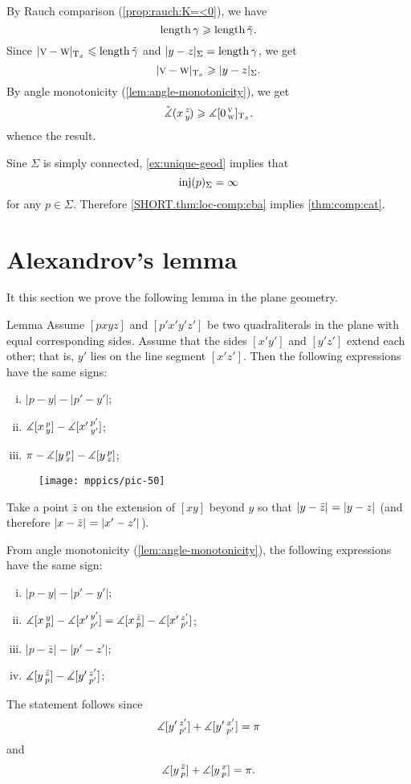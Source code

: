 By Rauch comparison (\ref{prop:rauch:K=<0}), we have
\[\mathop{\rm length}\nolimits\gamma\geqslant \mathop{\rm length}\nolimits \tilde \gamma.\]
Since $|\textsc v-\textsc w|_{\mathrm{T}_x}\leqslant\mathop{\rm length}\nolimits\tilde \gamma$ and $|y-z|_{\Sigma}= \mathop{\rm length}\nolimits\gamma$, we get 
\[|\textsc v-\textsc w|_{\mathrm{T}_x}\geqslant |y-z|_\Sigma.\]
By angle monotonicity (\ref{lem:angle-monotonicity}), we get
\[\tilde\measuredangle(x\,{}^{z}_{y}\hspace{-0.2ex})\geqslant\measuredangle[0\,{}^{\textsc v}_{\textsc w}]_{\mathrm{T}_x}.\]
whence the result.
\qeds

Sine $\Sigma$ is simply connected, \ref{ex:unique-geod} implies that 
\[\mathop{\rm inj}\nolimits(p)_\Sigma=\infty\]
for any $p\in\Sigma$.
Therefore \ref{SHORT.thm:loc-comp:cba} implies \ref{thm:comp:cat}.
\qeds


\section{Alexandrov's lemma}

It this section we prove the following lemma in the plane geometry.

\begin{thm}{Lemma}
\label{lem:alex}
Assume $[pxyz]$ and $[p'x'y'z']$ be two quadraliterals in the plane with equal corresponding sides.
Assume that the sides $[x'y']$ and $[y'z']$ extend each other; that is, $y'$ lies on the line segment $[x'z']$.
Then the following expressions have the same signs:
\begin{enumerate}[(i)]
 \item $|p-y|-|p'-y'|$;
 \item $\measuredangle[x\,{}^{p}_{y}]-\measuredangle[x'\,{}^{p'}_{y'}]$;
 \item $\pi-\measuredangle[y\,{}^{p}_{x}]-\measuredangle[y\,{}^{p}_{z}]$;
\end{enumerate}
\end{thm}

\begin{figure}[h!]
\vskip-0mm
\centering
\texttt{[image: mppics/pic-50]}
\vskip-0mm
\end{figure}

Take 
a point $\bar z$ on the extension of 
$[xy]$ beyond $y$ so that $\dist{y}{\bar z}{}=\dist{y}{z}{}$ (and therefore $\dist{x}{\bar z}{}=\dist{x'}{z'}{}$). 
 
From angle monotonicity (\ref{lem:angle-monotonicity}), 
the following expressions have the same sign:
\begin{enumerate}[(i)]
\item $|p-y|-|p'-y'|$;
\item $\measuredangle[x\,{}^{y}_{p}]-\measuredangle[x'\,{}^{y'}_{p'}]=\measuredangle[x\,{}^{\bar z}_{p}]-\measuredangle[x'\,{}^{z'}_{p'}]$;
\item $|p-\bar z|-|p'-z'|$;
\item $\measuredangle[y\,{}^{\bar z}_{p}]-\measuredangle[y'\,{}^{z'}_{p'}]$;
\end{enumerate}
The statement follows since
\[\measuredangle[y'\,{}^{z'}_{p'}]+\measuredangle[y'\,{}^{x'}_{p'}]=\pi\]
and
\[\measuredangle[y\,{}^{\bar z}_{p}]+\measuredangle[y\,{}^{x}_{p}]=\pi.\]
\qedsf

